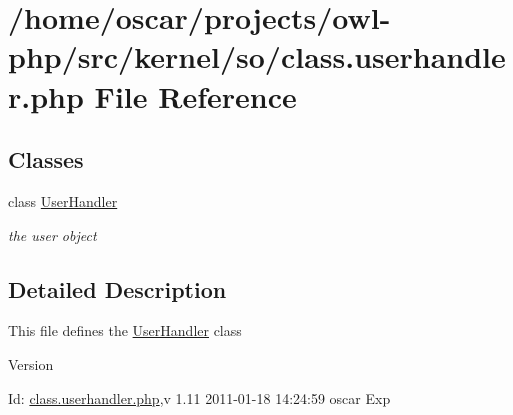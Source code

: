 \section{/home/oscar/projects/owl-\/php/src/kernel/so/class.userhandler.php File Reference}
\label{class_8userhandler_8php}
\subsection*{Classes}
\begin{DoxyCompactItemize}
\item 
class \hyperlink{classUserHandler}{UserHandler}
\begin{DoxyCompactList}\small\item\em the user object \item\end{DoxyCompactList}\end{DoxyCompactItemize}


\subsection{Detailed Description}
This file defines the \hyperlink{classUserHandler}{UserHandler} class \begin{DoxyVersion}{Version}

\end{DoxyVersion}
\begin{DoxyParagraph}{Id:}
\hyperlink{class_8userhandler_8php}{class.userhandler.php},v 1.11 2011-\/01-\/18 14:24:59 oscar Exp 
\end{DoxyParagraph}
